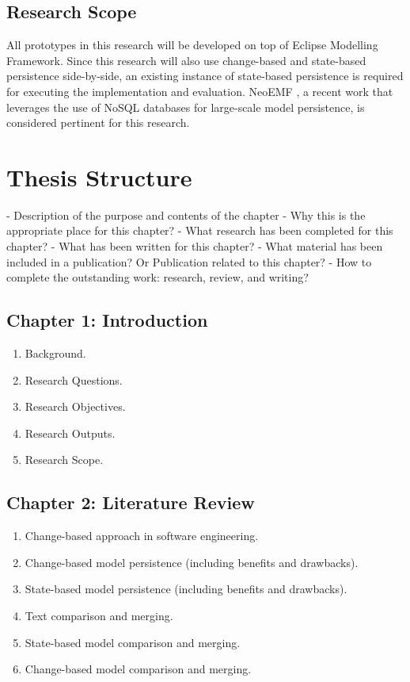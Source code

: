 \documentclass[12pt, a4paper]{report} \usepackage[titletoc]{appendix}
\begin{document}
\section{Research Scope}
\label{sec:research_scope}
All prototypes in this research will be developed on top of Eclipse Modelling Framework. Since this research will also use change-based and state-based persistence side-by-side, an existing instance of state-based persistence is required for executing the implementation and evaluation. NeoEMF \cite{daniel2016neoemf}, a recent work that leverages the use of NoSQL databases for large-scale model persistence, is considered pertinent for this research. 

\chapter{Thesis Structure}
\label{sec:Thesis Structure}

- Description of the purpose and contents of the chapter
- Why this is the appropriate place for this chapter?
- What research has been completed for this chapter?
- What has been written for this chapter?
- What material has been included in a publication? Or Publication related to this chapter?
- How to complete the outstanding work: research, review, and writing?

\section{Chapter 1: Introduction}
\label{sec:chapter_1_introduction_plan}
\begin{enumerate}
\setlength\itemsep{0pt}
\item Background.
\item Research Questions.
\item  Research Objectives.
\item  Research Outputs.
\item  Research Scope.
\end{enumerate}

\section{Chapter 2: Literature Review}
\label{sec:chapter_2_literature_review_plan}

\begin{enumerate}
\setlength\itemsep{0pt}
\item Change-based approach in software engineering.
\item Change-based model persistence (including benefits and drawbacks).
\item State-based model persistence (including benefits and drawbacks).
\item Text comparison and merging.
\item State-based model comparison and merging.
\item Change-based model comparison and merging.
\end{enumerate}
\end{document}
